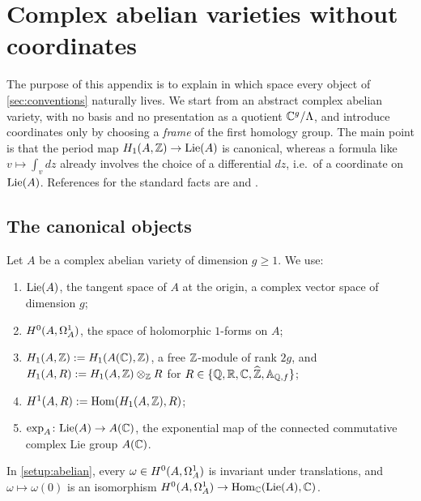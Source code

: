\chapter{Complex abelian varieties without coordinates}\label{app:abelian}

The purpose of this appendix is to explain in which space every object of
\cref{sec:conventions} naturally lives. We start from an abstract complex
abelian variety, with no basis and no presentation as a quotient
$\mathbb{C}^{g}/\Lambda$, and introduce coordinates only by choosing a
\emph{frame} of the first homology group. The main point is that the period
map $H_{1}(A,\mathbb{Z}) \to \mathrm{Lie}(A)$ is canonical, whereas a formula like
$v \mapsto \int_v dz$ already involves the choice of a differential
$dz$, i.e.\ of a coordinate on $\mathrm{Lie}(A)$. References for the standard
facts are \cite[\S\S 1--4]{Mumford1974} and \cite[Ch.~1, 2, 4]{BirkenhakeLange2004}.

\section{The canonical objects}

\begin{setup}\label{setup:abelian}
Let $A$ be a complex abelian variety of dimension $g \geq 1$. We use:
\begin{enumerate}
\item $\mathrm{Lie}(A)$, the tangent space of $A$ at the origin, a complex vector
  space of dimension $g$;
\item $H^{0}(A,\Omega^{1}_{A})$, the space of holomorphic $1$-forms on $A$;
\item $H_{1}(A,\mathbb{Z}) := H_1(A(\mathbb{C}), \mathbb{Z})$, a free $\mathbb{Z}$-module of rank
  $2g$, and $H_{1}(A,R) := H_{1}(A,\mathbb{Z})\otimes_{\mathbb{Z}} R$ for
  $R \in \{\mathbb{Q}, \mathbb{R}, \mathbb{C}, \widehat{\mathbb{Z}}, \mathbb{A}_{\mathbb{Q},f}\}$;
\item $H^{1}(A,R) := \operatorname{Hom}(H_{1}(A,\mathbb{Z}), R)$;
\item $\exp_{A} \colon \mathrm{Lie}(A) \to A(\mathbb{C})$, the exponential map of the
  connected commutative complex Lie group $A(\mathbb{C})$.
\end{enumerate}
\end{setup}

\begin{lemma}\label{lem:differentials-cotangent}
In \cref{setup:abelian}, every $\omega \in H^{0}(A,\Omega^{1}_{A})$ is invariant
under translations, and $\omega \mapsto \omega(0)$ is an isomorphism
$H^{0}(A,\Omega^{1}_{A}) \to \operatorname{Hom}_{\mathbb{C}}(\mathrm{Lie}(A), \mathbb{C})$.
\end{lemma}

